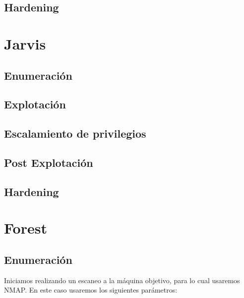 \documentclass{article}
\begin{document}
\subsection{Hardening}

\section{Jarvis}
\subsection{Enumeración}

\subsection{Explotación}

\subsection{Escalamiento de privilegios}


\subsection{Post Explotación}

\subsection{Hardening}


\clearpage 

\section{Forest}
\subsection{Enumeración}
Iniciamos realizando un escaneo a la máquina objetivo, para lo cual usaremos NMAP. En este caso usaremos los siguientes parámetros:
\end{document}

